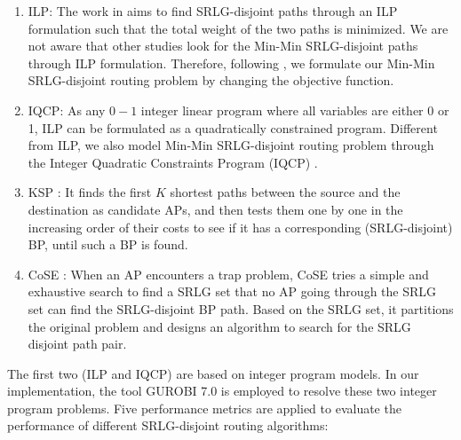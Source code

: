 \begin{enumerate}
  \item ILP: The work in \cite{hu2003diverse}  aims to find SRLG-disjoint paths through an ILP formulation such that the total weight of the two paths is minimized. We are not aware that other studies look for the Min-Min SRLG-disjoint paths through ILP formulation. Therefore, following \cite{hu2003diverse}, we formulate  our Min-Min SRLG-disjoint routing problem by changing the objective function.
  \item IQCP: As any $0-1$ integer linear program where all variables are either 0 or 1,  ILP can be formulated as a quadratically constrained program. Different from ILP, we also model Min-Min SRLG-disjoint routing problem through the Integer Quadratic Constraints Program (IQCP) \cite{hu2003diverse}.
  \item KSP \cite{eppstein1998finding}: It finds the first $K$ shortest paths between the source and the destination as candidate APs, and then tests them one by one in the increasing order of their costs to see if it has a corresponding (SRLG-disjoint) BP, until such a BP is found.
  \item CoSE \cite{rostami2007cose}: When an AP encounters a trap problem, CoSE tries a simple and exhaustive search to find a SRLG set that no AP going through the SRLG set can find the SRLG-disjoint BP path. Based on the SRLG set, it partitions the original problem  and designs an algorithm to search for the SRLG disjoint path pair.
\end{enumerate}
The first two (ILP and IQCP) are based on integer program models. In our implementation, the tool GUROBI 7.0 \cite{optimization2012gurobi} is employed to resolve these two integer program problems.  Five performance metrics are applied to evaluate the performance of different SRLG-disjoint routing algorithms:
